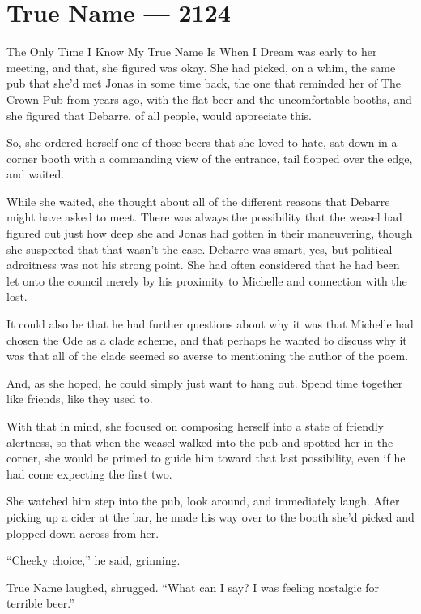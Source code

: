 \hypertarget{true-name-2124}{%
\chapter{True Name — 2124}\label{true-name-2124}}

The Only Time I Know My True Name Is When I Dream was early to her meeting, and that, she figured was okay. She had picked, on a whim, the same pub that she'd met Jonas in some time back, the one that reminded her of The Crown Pub from years ago, with the flat beer and the uncomfortable booths, and she figured that Debarre, of all people, would appreciate this.

So, she ordered herself one of those beers that she loved to hate, sat down in a corner booth with a commanding view of the entrance, tail flopped over the edge, and waited.

While she waited, she thought about all of the different reasons that Debarre might have asked to meet. There was always the possibility that the weasel had figured out just how deep she and Jonas had gotten in their maneuvering, though she suspected that that wasn't the case. Debarre was smart, yes, but political adroitness was not his strong point. She had often considered that he had been let onto the council merely by his proximity to Michelle and connection with the lost.

It could also be that he had further questions about why it was that Michelle had chosen the Ode as a clade scheme, and that perhaps he wanted to discuss why it was that all of the clade seemed so averse to mentioning the author of the poem.

And, as she hoped, he could simply just want to hang out. Spend time together like friends, like they used to.

With that in mind, she focused on composing herself into a state of friendly alertness, so that when the weasel walked into the pub and spotted her in the corner, she would be primed to guide him toward that last possibility, even if he had come expecting the first two.

She watched him step into the pub, look around, and immediately laugh. After picking up a cider at the bar, he made his way over to the booth she'd picked and plopped down across from her.

``Cheeky choice,'' he said, grinning.

True Name laughed, shrugged. ``What can I say? I was feeling nostalgic for terrible beer.''

